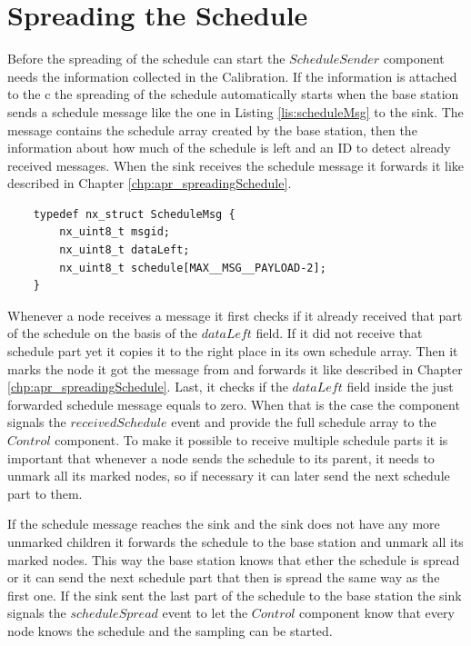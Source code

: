 \section{Spreading the Schedule}
Before the spreading of the schedule can start the $ScheduleSender$ component needs the information collected in the Calibration. If the information is attached to the c the spreading of the schedule automatically starts when the base station sends a schedule message like the one in  Listing \ref{lis:scheduleMsg} to the sink. The message contains the schedule array created by the base station, then the information about how much of the schedule is left and an ID to detect already received messages. When the sink receives the schedule message it forwards it like described in Chapter \ref{chp:apr_spreadingSchedule}.

\begin{lstlisting}
	typedef nx_struct ScheduleMsg {
		nx_uint8_t msgid;	
		nx_uint8_t dataLeft;
		nx_uint8_t schedule[MAX__MSG__PAYLOAD-2];
	}
\end{lstlisting}

Whenever a node receives a message it first checks if it already received that part of the schedule on the basis of the $dataLeft$ field. If it did not receive that schedule part yet it copies it to the right place in its own schedule array. Then it marks the node it got the message from and forwards it like described in Chapter \ref{chp:apr_spreadingSchedule}. Last, it checks if the $dataLeft$ field inside the just forwarded schedule message equals to zero. When that is the case the component signals the $receivedSchedule$ event and provide the full schedule array to the $Control$ component.
To make it possible to receive multiple schedule parts it is important that whenever a node sends the schedule to its parent, it needs to unmark all its marked nodes, so if necessary it can later send the next schedule part to them.

If the schedule message reaches the sink and the sink does not have any more unmarked children it forwards the schedule to the base station and unmark all its marked nodes. This way the base station knows that ether the schedule is spread or it can send the next schedule part that then is spread the same way as the first one. If the sink sent the last part of the schedule to the base station the sink signals the $scheduleSpread$ event to let the $Control$ component know that every node knows the schedule and the sampling can be started. 

